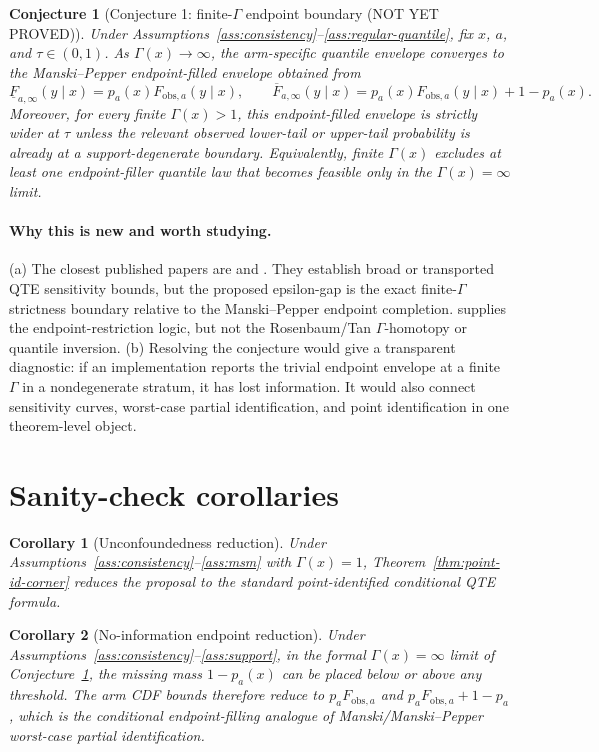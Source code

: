 \documentclass[11pt]{article}
\theoremstyle{definition}
\theoremstyle{plain}
\newtheorem{conjecture}{Conjecture}
\newtheorem{corollary}{Corollary}
\theoremstyle{remark}
\begin{document}
\begin{conjecture}[Conjecture 1: finite-\(\Gamma\) endpoint boundary (NOT YET PROVED)]\label{conj:finite-gamma-boundary}
Under Assumptions~\ref{ass:consistency}--\ref{ass:regular-quantile}, fix \(x\), \(a\), and \(\tau\in(0,1)\).  As \(\Gamma(x)\to\infty\), the arm-specific quantile envelope converges to the Manski--Pepper endpoint-filled envelope obtained from
\[
\underline F_{a,\infty}(y\mid x)=p_a(x)F_{\mathrm{obs},a}(y\mid x),\qquad
\overline F_{a,\infty}(y\mid x)=p_a(x)F_{\mathrm{obs},a}(y\mid x)+1-p_a(x).
\]
Moreover, for every finite \(\Gamma(x)>1\), this endpoint-filled envelope is strictly wider at \(\tau\) unless the relevant observed lower-tail or upper-tail probability is already at a support-degenerate boundary.  Equivalently, finite \(\Gamma(x)\) excludes at least one endpoint-filler quantile law that becomes feasible only in the \(\Gamma(x)=\infty\) limit.
\end{conjecture}
\paragraph{Why this is new and worth studying.}
(a) The closest published papers are \citet{MastenPoirierRen2025} and \citet{Wang2026}.  They establish broad or transported QTE sensitivity bounds, but the proposed epsilon-gap is the exact finite-\(\Gamma\) strictness boundary relative to the Manski--Pepper endpoint completion.  \citet{ManskiPepper2000} supplies the endpoint-restriction logic, but not the Rosenbaum/Tan \(\Gamma\)-homotopy or quantile inversion.  (b) Resolving the conjecture would give a transparent diagnostic: if an implementation reports the trivial endpoint envelope at a finite \(\Gamma\) in a nondegenerate stratum, it has lost information.  It would also connect sensitivity curves, worst-case partial identification, and point identification in one theorem-level object.

\section{Sanity-check corollaries}
\begin{corollary}[Unconfoundedness reduction]\label{cor:unconfounded}
Under Assumptions~\ref{ass:consistency}--\ref{ass:msm} with \(\Gamma(x)=1\), Theorem~\ref{thm:point-id-corner} reduces the proposal to the standard point-identified conditional QTE formula.
\end{corollary}

\begin{corollary}[No-information endpoint reduction]\label{cor:noinfo}
Under Assumptions~\ref{ass:consistency}--\ref{ass:support}, in the formal \(\Gamma(x)=\infty\) limit of Conjecture~\ref{conj:finite-gamma-boundary}, the missing mass \(1-p_a(x)\) can be placed below or above any threshold.  The arm CDF bounds therefore reduce to \(p_aF_{\mathrm{obs},a}\) and \(p_aF_{\mathrm{obs},a}+1-p_a\), which is the conditional endpoint-filling analogue of Manski/Manski--Pepper worst-case partial identification.
\end{corollary}
\end{document}
